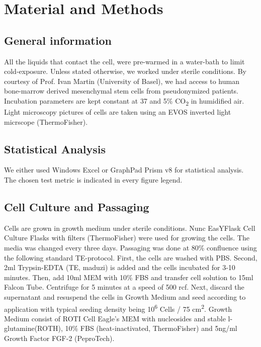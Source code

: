 \newcommand{\product}{\textit}

\chapter{Material and Methods}

\section{General information}
All the liquids that contact the cell, were pre-warmed in a water-bath to limit cold-exposure. Unless stated otherwise, we worked under sterile conditions. By courtesy of Prof. Ivan Martin (University of Basel), we had access to human bone-marrow derived mesenchymal stem cells from pseudonymized patients. Incubation parameters are kept constant at 37 \degC and 5\% CO\textsubscript{2} in humidified air. Light microscopy pictures of cells are taken using an EVOS inverted light micrscope (ThermoFisher).

\section{Statistical Analysis}
We either used Windows Excel or GraphPad Prism v8 for statistical analysis. The chosen test metric is indicated in every figure legend.

\section{Cell Culture and Passaging}
Cells are grown in growth medium under sterile conditions. Nunc\texttrademark{} EasYFlask\texttrademark{} Cell Culture Flasks with filters (ThermoFisher) were used for growing the cells. The media was changed every three days. Passaging was done at 80\% confluence using the following standard TE-protocol. First, the cells are washed with PBS. Second, 2ml Trypsin-EDTA (TE, maduzi) is added and the cells incubated for 3-10 minutes. Then, add 10ml MEM\textalpha{} with 10\% FBS and transfer cell solution to 15ml Falcon Tube. Centrifuge for 5 minutes at a speed of 500 rcf. Next, discard the supernatant and resuspend the cells in Growth Medium and seed according to application with typical seeding density being 10\textsuperscript{6} Cells / 75 cm\textsuperscript{2}. 
Growth Medium consist of ROTI\textregistered{} Cell Eagle's MEM\textalpha{} with nucleosides and stable l-glutamine(ROTH), 10\% FBS (heat-inactivated, ThermoFisher) and 5ng/ml Growth Factor FGF-2 (PeproTech).

